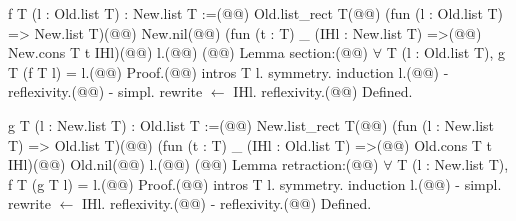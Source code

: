 f T (l : Old.list T) : New.list T :=(@\vspace{-0.04cm}@)
  Old.list_rect T(@\vspace{-0.04cm}@)
    (fun (l : Old.list T) => New.list T)(@\vspace{-0.04cm}@)
    New.nil(@\vspace{-0.04cm}@)
    (fun (t : T) _ (IHl : New.list T) =>(@\vspace{-0.04cm}@)
      New.cons T t IHl)(@\vspace{-0.04cm}@)
    l.(@\vspace{-0.04cm}@)
(@\vspace{-0.04cm}@)
Lemma section:(@\vspace{-0.04cm}@)
  $\forall$ T (l : Old.list T), g T (f T l) = l.(@\vspace{-0.04cm}@)
Proof.(@\vspace{-0.04cm}@)
  intros T l. symmetry. induction l.(@\vspace{-0.04cm}@)
  - reflexivity.(@\vspace{-0.04cm}@)
  - simpl. rewrite $\leftarrow$ IHl. reflexivity.(@\vspace{-0.04cm}@)
Defined.

g T (l : New.list T) : Old.list T :=(@\vspace{-0.04cm}@)
  New.list_rect T(@\vspace{-0.04cm}@)
    (fun (l : New.list T) => Old.list T)(@\vspace{-0.04cm}@)
    (fun (t : T) _ (IHl : Old.list T) =>(@\vspace{-0.04cm}@)
      Old.cons T t IHl)(@\vspace{-0.04cm}@)
    Old.nil(@\vspace{-0.04cm}@)
    l.(@\vspace{-0.04cm}@)
(@\vspace{-0.04cm}@)
Lemma retraction:(@\vspace{-0.04cm}@)
  $\forall$ T (l : New.list T), f T (g T l) = l.(@\vspace{-0.04cm}@)
Proof.(@\vspace{-0.04cm}@)
  intros T l. symmetry. induction l.(@\vspace{-0.04cm}@)
  - simpl. rewrite $\leftarrow$ IHl. reflexivity.(@\vspace{-0.04cm}@)
  - reflexivity.(@\vspace{-0.04cm}@)
Defined.
